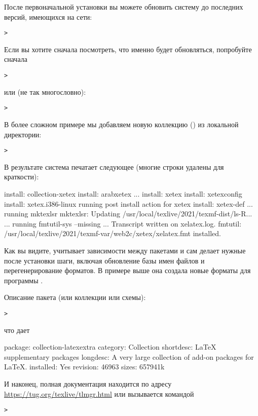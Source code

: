 \documentclass{article}
\begin{document}
После первоначальной установки вы можете обновить систему до последних
версий, имеющихся на сети:
\begin{alltt}
> 
\end{alltt}
Если вы хотите сначала посмотреть, что именно будет обновляться,
попробуйте сначала
\begin{alltt}
> 
\end{alltt}
или (не так многословно):
\begin{alltt}
> 
\end{alltt}

В более сложном примере мы добавляем новую коллекцию (\XeTeX) из
локальной директории:

\begin{alltt}
> 
\end{alltt}
В результате система печатает следующее (многие строки удалены для
краткости): 
\begin{fverbatim}
install: collection-xetex
install: arabxetex
...
install: xetex
install: xetexconfig
install: xetex.i386-linux
running post install action for xetex
install: xetex-def
...
running mktexlsr
mktexlsr: Updating /usr/local/texlive/2021/texmf-dist/ls-R...
...
running fmtutil-sys --missing
...
Transcript written on xelatex.log.
fmtutil: /usr/local/texlive/2021/texmf-var/web2c/xetex/xelatex.fmt installed.
\end{fverbatim}

Как вы видите,   учитывает зависимости между пакетами и
сам делает нужные после установки шаги, включая обновление базы имен
файлов и перегенерирование форматов.  В примере выше она создала
новые форматы для программы \XeTeX.

Описание пакета (или коллекции или схемы):
\begin{alltt}
> 
\end{alltt}
что дает
\begin{fverbatim}
package:    collection-latexextra
category:   Collection
shortdesc:  LaTeX supplementary packages
longdesc:   A very large collection of add-on packages for LaTeX.
installed:  Yes
revision:   46963
sizes:      657941k
\end{fverbatim}

И наконец, полная документация находится по адресу
\url{https://tug.org/texlive/tlmgr.html} или вызывается командой
\begin{alltt}
> 
\end{alltt}
\end{document}
